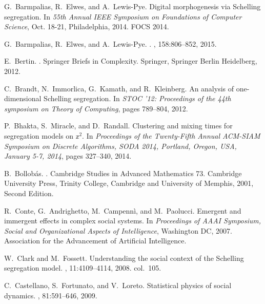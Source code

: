 \documentclass[11pt]{article}
\theoremstyle{plain}
\numberwithin{equation}{subsection}
\begin{document}
\begin{thebibliography}{CMGP13}

G.~Barmpalias, R.~Elwes, and A.~Lewis-Pye.
\newblock Digital morphogenesis via {S}chelling segregation.
\newblock In {\em 55th Annual IEEE Symposium on Foundations of Computer
  Science}, Oct. 18-21, Philadelphia, 2014. FOCS 2014.

G.~Barmpalias, R.~Elwes, and A.~Lewis-Pye.
.
, 158:806--852, 2015.

E.~Bertin.
.
\newblock Springer Briefs in Complexity. Springer, Springer Berlin Heidelberg,
  2012.

C.~Brandt, N.~Immorlica, G.~Kamath, and R.~Kleinberg.
\newblock An analysis of one-dimensional {S}chelling segregation.
\newblock In {\em STOC '12: Proceedings of the 44th symposium on Theory of
  Computing}, pages 789--804, 2012.

P.~Bhakta, S.~Miracle, and D.~Randall.
\newblock Clustering and mixing times for segregation models on
  {\(\mathbb{z}\)}\({}^{\mbox{2}}\).
\newblock In {\em Proceedings of the Twenty-Fifth Annual {ACM-SIAM} Symposium
  on Discrete Algorithms, {SODA} 2014, Portland, Oregon, USA, January 5-7,
  2014}, pages 327--340, 2014.

B.~Bollob\'{a}s.
.
\newblock Cambridge Studies in Advanced Mathematics 73. Cambridge University
  Press, Trinity College, Cambridge and University of Memphis, 2001, Second
  Edition.

R.~Conte, G.~Andrighetto, M.~Campenn\`{i}, and M.~Paolucci.
\newblock Emergent and immergent effects in complex social systems.
\newblock In {\em Proceedings of AAAI Symposium, Social and Organizational
  Aspects of Intelligence}, Washington DC, 2007. Association for the
  Advancement of Artificial Intelligence.

W.\ Clark and M.\ Fossett.
\newblock Understanding the social context of the {S}chelling segregation
  model.
, 11:4109--4114,
  2008.
\newblock col.\ 105.

C.~Castellano, S.~Fortunato, and V.~Loreto.
\newblock Statistical physics of social dynamics.
, 81:591--646, 2009.


\end{thebibliography}
\end{document}
